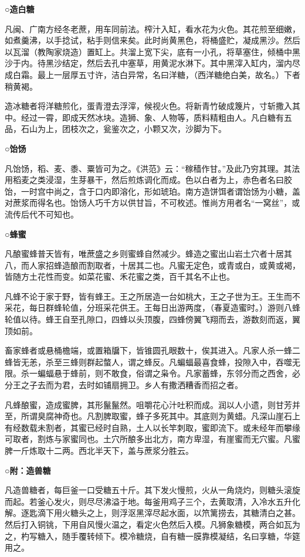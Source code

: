 \documentclass[]{article}
\begin{document}
\textbf{○造白糖}

凡闽、广南方经冬老蔗，用车同前法。榨汁入缸，看水花为火色。其花煎至细嫩，如煮羹沸，以手捻试，粘手则信来矣。此时尚黄黑色，将桶盛贮，凝成黑沙。然后以瓦溜（教陶家烧造）置缸上。共溜上宽下尖，底有一小孔，将草塞住，倾桶中黑沙于内。待黑沙结定，然后去孔中塞草，用黄泥水淋下。其中黑滓入缸内，溜内尽成白霜。最上一层厚五寸许，洁白异常，名曰洋糖，（西洋糖绝白美，故名。）下者稍黄褐。

造冰糖者将洋糖煎化，蛋青澄去浮滓，候视火色。将新青竹破成篾片，寸斩撒入其中。经过一霄，即成天然冰块。造狮、象、人物等，质料精粗由人。凡白糖有五品，石山为上，团枝次之，瓮鉴次之，小颗又次，沙脚为下。

\textbf{○饴饧}

凡饴饧，稻、麦、黍、粟皆可为之。《洪范》云：``稼穑作甘。''及此乃穷其理。其法用稻麦之类浸湿，生芽暴干，然后煎炼调化而成。色以白者为上，赤色者名曰胶饴，一时宫中尚之，含于口内即溶化，形如琥珀。南方造饼饵者谓饴饧为小糖，盖对蔗浆而得名也。饴饧人巧千方以供甘旨，不可枚述。惟尚方用者名``一窝丝''，或流传后代不可知也。

\textbf{○蜂蜜}

凡酿蜜蜂普天皆有，唯蔗盛之乡则蜜蜂自然减少。蜂造之蜜出山岩土穴者十居其八，而人家招蜂造酿而割取者，十居其二也。凡蜜无定色，或青或白，或黄或褐，皆随方土花性而变。如菜花蜜、禾花蜜之类，百千其名不止也。

凡蜂不论于家于野，皆有蜂王。王之所居造一台如桃大，王之子世为王。王生而不采花，每日群蜂轮值，分班采花供王。王每日出游两度，（春夏造蜜时。）游则八蜂轮值以待。蜂王自至孔隙口，四蜂以头顶腹，四蜂傍翼飞翔而去，游数刻而返，翼顶如前。

畜家蜂者或悬桶檐端，或置箱牖下，皆锥圆孔眼数十，俟其进入。凡家人杀一蜂二蜂皆无恙，杀至三蜂则群起螫人，谓之蜂反。凡蝙蝠最喜食蜂，投隙入中，吞噬无限。杀一蝙蝠悬于蜂前，则不敢食，俗谓之枭令。凡家蓄蜂，东邻分而之西舍，必分王之子去而为君，去时如铺扇拥卫。乡人有撒洒糟香而招之者。

凡蜂酿蜜，造成蜜脾，其形鬣鬣然。咀嚼花心汁吐积而成。润以人小遗，则甘芳并至，所谓臭腐神奇也。凡割脾取蜜，蜂子多死其中。其底则为黄蜡。凡深山崖石上有经数载未割者，其蜜已经时自熟，土人以长竿刺取，蜜即流下。或未经年而攀缘可取者，割炼与家蜜同也。土穴所酿多出北方，南方卑湿，有崖蜜而无穴蜜。凡蜜脾一斤炼取十二两。西北半天下，盖与蔗浆分胜云。

\textbf{○附：造兽糖}

凡造兽糖者，每巨釜一口受糖五十斤。其下发火慢煎，火从一角烧灼，则糖头滚旋而起。若釜心发火，则尽尽沸溢于地。每釜用鸡子三个，去黄取清，入冷水五升化解。逐匙滴下用火糖头之上，则浮沤黑滓尽起水面，以笊篱捞去，其糖清白之甚。然后打入铜铫，下用自风慢火温之，看定火色然后入模。凡狮象糖模，两合如瓦为之，杓写糖入，随手覆转倾下。模冷糖烧，自有糖一膜靠模凝结，名曰享糖，华筵用之。
\end{document}
